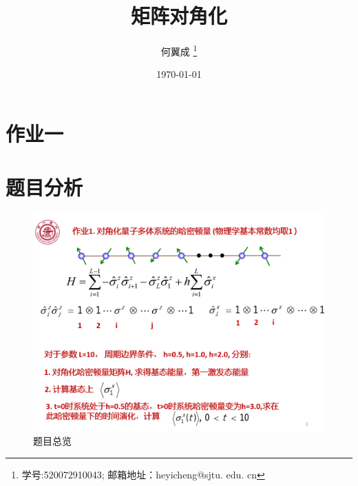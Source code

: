 \documentclass[UTF8,a4paper,10pt]{ctexart}
\title{\textbf{矩阵对角化}}
\author{ 何翼成 \thanks{学号:520072910043; \newline
    邮箱地址：heyicheng@sjtu. edu. cn} }
\date{\today}
\begin{document}
\maketitle

\section*{作业一}
\section{题目分析}
	\begin{figure}[!htbp]
		\centering
		\includegraphics[width=1\textwidth,height=0.6\textwidth]{pictures/pro.png}
		\caption{题目总览} \label{project1}
	\end{figure}
\end{document}
